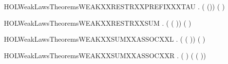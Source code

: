 \newcommand{\HOLWeakLawsTheoremsWEAKXXRESTRXXPREFIXXXLABEL}{\UseVerbatim{HOLWeakLawsTheoremsWEAKXXRESTRXXPREFIXXXLABEL}}
\begin{SaveVerbatim}{HOLWeakLawsTheoremsWEAKXXRESTRXXPREFIXXXTAU}
\HOLTokenTurnstile{} \HOLSymConst{\HOLTokenForall{}} .  (\HOLConst{\ensuremath{\nu}}  (\HOLConst{\ensuremath{\tau}})) (\HOLConst{\ensuremath{\tau}}\HOLConst{\ensuremath{\nu}}  )
\end{SaveVerbatim}
\newcommand{\HOLWeakLawsTheoremsWEAKXXRESTRXXPREFIXXXTAU}{\UseVerbatim{HOLWeakLawsTheoremsWEAKXXRESTRXXPREFIXXXTAU}}
\begin{SaveVerbatim}{HOLWeakLawsTheoremsWEAKXXRESTRXXSUM}
\HOLTokenTurnstile{} \HOLSymConst{\HOLTokenForall{}}  .  (\HOLConst{\ensuremath{\nu}}  ( \HOLSymConst{+} )) (\HOLConst{\ensuremath{\nu}}   \HOLSymConst{+} \HOLConst{\ensuremath{\nu}}  )
\end{SaveVerbatim}
\newcommand{\HOLWeakLawsTheoremsWEAKXXRESTRXXSUM}{\UseVerbatim{HOLWeakLawsTheoremsWEAKXXRESTRXXSUM}}
\begin{SaveVerbatim}{HOLWeakLawsTheoremsWEAKXXSUMXXASSOCXXL}
\HOLTokenTurnstile{} \HOLSymConst{\HOLTokenForall{}}  .  ( \HOLSymConst{+} ( \HOLSymConst{+} )) ( \HOLSymConst{+}  \HOLSymConst{+} )
\end{SaveVerbatim}
\newcommand{\HOLWeakLawsTheoremsWEAKXXSUMXXASSOCXXL}{\UseVerbatim{HOLWeakLawsTheoremsWEAKXXSUMXXASSOCXXL}}
\begin{SaveVerbatim}{HOLWeakLawsTheoremsWEAKXXSUMXXASSOCXXR}
\HOLTokenTurnstile{} \HOLSymConst{\HOLTokenForall{}}  .  ( \HOLSymConst{+}  \HOLSymConst{+} ) ( \HOLSymConst{+} ( \HOLSymConst{+} ))
\end{SaveVerbatim}
\newcommand{\HOLWeakLawsTheoremsWEAKXXSUMXXASSOCXXR}{\UseVerbatim{HOLWeakLawsTheoremsWEAKXXSUMXXASSOCXXR}}
